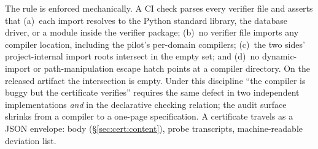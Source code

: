  The rule is enforced mechanically. A CI check parses every verifier file and
asserts that (a)~each import resolves to the Python standard library, the
database driver, or a module inside the verifier package; (b)~no verifier file
imports any compiler location, including the pilot's per-domain compilers;
(c)~the two sides' project-internal import roots intersect in the empty set; and
(d)~no dynamic-import or path-manipulation escape hatch points at a compiler
directory. On the released artifact the intersection is empty. Under this
discipline ``the compiler is buggy but the certificate verifies'' requires
the same defect in two independent implementations
\emph{and} in the declarative checking relation; the audit surface shrinks
from a compiler to a one-page specification. A certificate travels as a JSON envelope: body
(\S\ref{sec:cert:content}), probe transcripts, machine-readable
deviation list.
